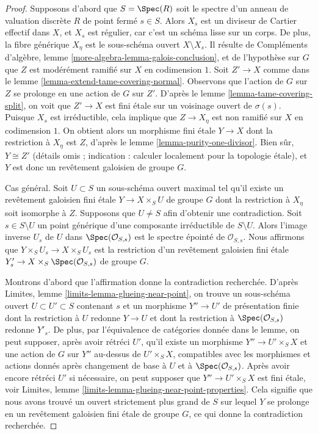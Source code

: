 \begin{proof}
Supposons d'abord que $S = \Spec(R)$ soit le spectre d'un anneau de valuation discrète $R$
de point fermé $s \in S$. Alors $X_s$ est un diviseur de Cartier effectif
dans $X$, et $X_s$ est régulier, car c'est un schéma lisse sur un corps.
De plus, la fibre générique $X_\eta$ est le sous-schéma ouvert $X \setminus X_s$.
Il résulte de
Compléments d'algèbre, lemme \ref{more-algebra-lemma-galois-conclusion},
et de l'hypothèse sur $G$ que $Z$ est modérément ramifié
sur $X$ en codimension $1$. Soit $Z' \to X$ comme dans le
lemme \ref{lemma-extend-tame-covering-normal}. Observons que
l'action de $G$ sur $Z$ se prolonge en une action de $G$ sur $Z'$.
D'après le lemme \ref{lemma-tame-covering-split},
on voit que $Z' \to X$ est fini \'etale sur un voisinage
ouvert de $\sigma(s)$.
Puisque $X_s$ est irréductible, cela implique que $Z \to X_\eta$
est non ramifié sur $X$ en codimension $1$.
On obtient alors un morphisme fini \'etale $Y \to X$
dont la restriction à $X_\eta$ est $Z$, d'après le
lemme \ref{lemma-purity-one-divisor}.
Bien sûr, $Y \cong Z'$ (détails omis ; indication : calculer localement pour la topologie \'etale),
et $Y$ est donc un revêtement galoisien de groupe $G$.

\medskip\noindent
Cas général. Soit $U \subset S$ un sous-schéma ouvert maximal
tel qu'il existe un revêtement galoisien fini \'etale
$Y \to X \times_S U$ de groupe $G$
dont la restriction à $X_\eta$ soit isomorphe à $Z$.
Supposons que $U \not = S$ afin d'obtenir une contradiction.
Soit $s \in S \setminus U$ un point générique d'une composante irréductible
de $S \setminus U$. Alors l'image inverse $U_s$
de $U$ dans $\Spec(\mathcal{O}_{S, s})$
est le spectre épointé de $\mathcal{O}_{S, s}$.
Nous affirmons que $Y \times_S U_s \to X \times_S U_s$
est la restriction d'un revêtement galoisien fini \'etale
$Y'_s \to X \times_S \Spec(\mathcal{O}_{S, s})$
de groupe $G$.

\medskip\noindent
Montrons d'abord que l'affirmation donne la contradiction recherchée.
D'après Limites, lemme \ref{limits-lemma-glueing-near-point},
on trouve un sous-schéma ouvert $U \subset U' \subset S$
contenant $s$ et un morphisme $Y'' \to U'$ de présentation finie
dont la restriction à $U$ redonne $Y \to U$ et
dont la restriction à $\Spec(\mathcal{O}_{S, s})$ redonne $Y'_s$.
De plus, par l'équivalence de catégories donnée dans le
lemme, on peut supposer, après avoir rétréci $U'$,
qu'il existe un morphisme $Y'' \to U' \times_S X$
et une action de $G$ sur $Y''$ au-dessus de $U' \times_S X$,
compatibles avec les morphismes et actions donnés après
changement de base à $U$ et à $\Spec(\mathcal{O}_{S, s})$.
Après avoir encore rétréci $U'$ si nécessaire, on peut
supposer que $Y'' \to U' \times_S X$ est fini \'etale, voir
Limites, lemme \ref{limits-lemma-glueing-near-point-properties}.
Cela signifie que nous avons trouvé un ouvert strictement plus grand de $S$ sur lequel
$Y$ se prolonge en un revêtement galoisien fini \'etale de groupe $G$,
ce qui donne la contradiction recherchée.


\end{proof}
